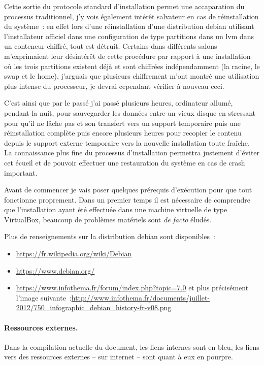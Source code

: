 \documentclass[12pt, a4paper]{report}
\begin{document}
Cette sortie du protocole standard d'installation permet une accaparation du processus traditionnel, j'y vois également intérêt salvateur en cas de réinstallation du système~: en effet lors d'une réinstallation d'une distribution debian utilisant l'installateur officiel dans une configuration de type partitions dans un lvm dans un conteneur chiffré, tout est détruit. 
Certains dans différents salons m'exprimaient leur désintérêt de cette procédure par rapport à une installation où les trois partitions existent déjà et sont chiffrées indépendamment (la racine, le swap et le home), j'arguais que plusieurs chiffrement m'ont montré une utilisation plus intense du processeur, je devrai cependant vérifier à nouveau ceci.

C'est ainsi que par le passé j'ai passé plusieurs heures, ordinateur allumé, pendant la nuit, pour sauvegarder les données entre un vieux disque en stressant pour qu'il ne lâche pas et son transfert vers un support temporaire puis une réinstallation complète puis encore plusieurs heures pour recopier le contenu depuis le support externe temporaire vers la nouvelle installation toute fraîche. 
La connaissance plus fine du processus d'installation permettra justement d'éviter cet écueil et de pouvoir effectuer une restauration du système en cas de crash important.

Avant de commencer je vais poser quelques prérequis d'exécution pour que tout fonctionne proprement. 
Dans un premier temps il est nécessaire de comprendre que l'installation ayant été effectuée dans une machine virtuelle de type VirtualBox, beaucoup de problèmes matériels sont \emph{de facto} éludés.

Plus de renseignements sur la distribution debian sont disponibles~:
\begin{itemize}
	\item \url{https://fr.wikipedia.org/wiki/Debian}
	\item \url{https://www.debian.org/}
	\item \url{https://www.infothema.fr/forum/index.php?topic=7.0} et plus précisément l'image suivante~:\newline \url{http://www.infothema.fr/documents/juillet-2012/750_infographic_debian_history-fr-v08.png}
\end{itemize}

\paragraph{Ressources externes.}
Dans la compilation actuelle du document, les liens internes sont en bleu, les liens vers des ressources externes -- sur internet -- sont quant à eux en pourpre.
\end{document}
